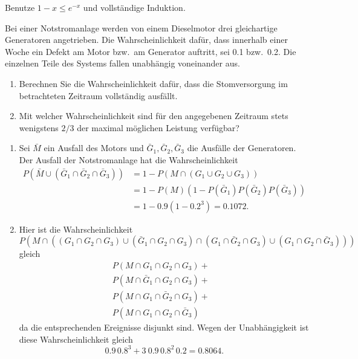 \solution Benutze $1-x \leq e^{-x}$ und vollständige Induktion.


Bei einer Notstromanlage werden von einem Dieselmotor drei gleichartige
Generatoren angetrieben. Die Wahrscheinlichkeit dafür, dass innerhalb einer
Woche ein Defekt am Motor bzw.\ am Generator auftritt, sei 0.1 bzw.~0.2. Die
einzelnen Teile des Systems fallen unabhängig voneinander aus.
\begin{enumerate}
\item Berechnen Sie die Wahrscheinlichkeit dafür, dass die Stomversorgung
im betrachteten Zeitraum vollständig ausfällt.
\item Mit welcher Wahrscheinlichkeit sind für den angegebenen Zeitraum
stets wenigstens $2/3$ der maximal möglichen Leistung verfügbar?
\end{enumerate}

\solution
\begin{enumerate}
    \item Sei $\bar M$ ein Ausfall des Motors und $\bar G_1, \bar G_2, \bar G_3$ die Ausfälle 
        der Generatoren. Der Ausfall der Notstromanlage hat die Wahrscheinlichkeit
        \begin{align*}
            P\left( \bar M \cup ( \bar G_1 \cap \bar G_2 \cap \bar G_3)   \right) &= 
            1 - P\left(  M \cap ( G_1 \cup G_2 \cup G_3 )  \right) \\
            &= 1 - P\left( M \right) \left( 1 - P(\bar G_1)P(\bar G_2)P(\bar G_3) \right) \\
            &= 1 - 0.9(1- {0.2}^{3}) = 0.1072.
        \end{align*}
    \item Hier ist die Wahrscheinlichkeit
            \[P\left( M \cap \left(  (G_1\cap G_2 \cap G_3) \cup (\bar G_1 \cap G_2 \cap G_3) \cap (G_1 \cap \bar G_2\cap G_3)
            \cup (G_1 \cap G_2 \cap \bar G_3)\right) \right) \] 
            gleich
            \begin{align*}
            P( M \cap G_1 \cap G_2 \cap G_3) +  & \\
            P( M \cap \bar G_1 \cap G_2 \cap G_3) + & \\
            P( M \cap G_1 \cap \bar G_2 \cap G_3) + & \\
            P( M \cap G_1 \cap G_2 \cap \bar G_3) &
            \end{align*}
            da die entsprechenden Ereignisse disjunkt sind. Wegen der Unabhängigkeit 
            ist diese Wahrscheinlichkeit gleich
            \begin{equation*}
                0.9\, {0.8}^{3} + 3\ 0.9\, {0.8}^2\, 0.2 = 0.8064.
            \end{equation*}
\end{enumerate}


